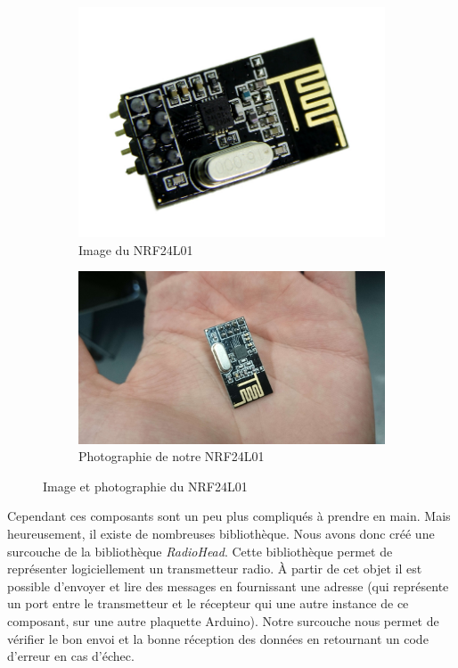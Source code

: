\documentclass[a4paper,10pt]{report}
\begin{document}
	    \begin{figure}
	      \begin{subfigure}{.5\textwidth}
		\centering
		\includegraphics[scale=0.4]{img/image_nrf24l01.jpg}
		\caption{Image du NRF24L01}
		\label{imagenrf24L01}
	      \end{subfigure}%
	      \begin{subfigure}{.5\textwidth}
		\centering
		\includegraphics[scale=0.06]{img/nrf24l01.jpg}
		\caption{Photographie de notre NRF24L01}
		\label{photonrf24L01}
	      \end{subfigure}
	      \caption{Image et photographie du NRF24L01}
	      \label{nrf24l01}
	    \end{figure}
	    
	Cependant ces composants sont un peu plus compliqués à prendre en main. 
Mais heureusement, il existe de nombreuses bibliothèque. Nous avons donc créé 
une surcouche de la bibliothèque \textit{RadioHead}\cite{radiohead}. Cette 
bibliothèque permet de représenter logiciellement un transmetteur radio. À 
partir de cet objet il est possible d'envoyer et lire des messages en 
fournissant une adresse (qui représente un port entre le transmetteur et le 
récepteur qui une autre instance de ce composant, sur une autre plaquette 
Arduino). Notre surcouche nous permet de vérifier le bon envoi et la bonne 
réception des données en retournant un code d'erreur en cas d'échec.
\end{document}

